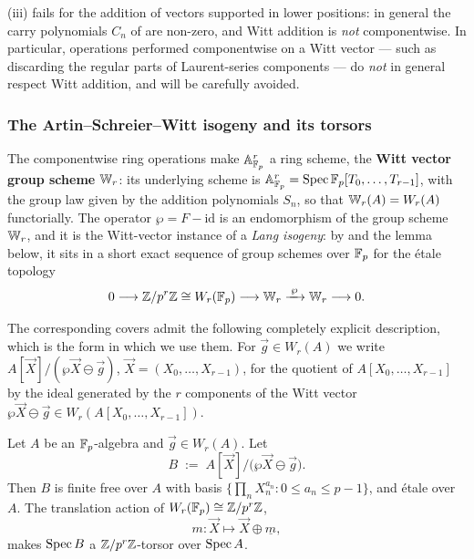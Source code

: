 \begin{rem*}
(iii) fails for the addition of vectors supported in
lower positions: in general the carry polynomials $C_n$ of
 are non-zero, and Witt addition is \emph{not}
componentwise. In particular, operations performed componentwise on a Witt vector ---
such as discarding the regular parts of Laurent-series components --- do \emph{not}
in general respect Witt addition, and will be carefully avoided.
\end{rem*}

\subsubsection*{The Artin--Schreier--Witt isogeny and its torsors}

The componentwise ring operations make $\mathbb{A}^r_{\mathbb{F}_p}$ a ring scheme, the
\textbf{Witt vector group scheme} $\mathbb{W}_r$: its underlying scheme is
$\mathbb{A}^r_{\mathbb{F}_p} = \operatorname{Spec} \mathbb{F}_p[T_0, \dots, T_{r-1}]$, with the group law given by the
addition polynomials $S_n$, so that $\mathbb{W}_r(A) = W_r(A)$ functorially. The operator
$\wp = F - \mathrm{id}$ is an endomorphism of the group scheme $\mathbb{W}_r$, and it is the
Witt-vector instance of a \emph{Lang isogeny}: by  and the
lemma below, it sits in a short exact sequence of group schemes over $\mathbb{F}_p$ for the
\'etale topology
\begin{equation}\label{eq:asw_lang_sequence:reorg}
0 \longrightarrow \mathbb{Z}/p^r\mathbb{Z} \cong W_r(\mathbb{F}_p)
\longrightarrow \mathbb{W}_r \xrightarrow{\;\wp\;} \mathbb{W}_r \longrightarrow 0 .
\end{equation}

The corresponding covers admit the following completely explicit description, which
is the form in which we use them. For $\vec g \in W_r(A)$ we write
$A[\vec X]/(\wp \vec X \ominus \vec g)$, $\vec X = (X_0, \dots, X_{r-1})$, for the
quotient of $A[X_0, \dots, X_{r-1}]$ by the ideal generated by the $r$ components of
the Witt vector $\wp \vec X \ominus \vec g \in W_r(A[X_0, \dots, X_{r-1}])$.

\begin{lemma}\label{lemma:asw_etale_torsor:reorg}
Let $A$ be an $\mathbb{F}_p$-algebra and $\vec g \in W_r(A)$. Let
\[
B \;:=\; A[\vec X]\big/\bigl(\wp \vec X \ominus \vec g\bigr).
\]
Then $B$ is finite free over $A$ with basis
$\bigl\{\prod_{n} X_n^{a_n} : 0 \le a_n \le p-1\bigr\}$, and \'etale over $A$. The
translation action of $W_r(\mathbb{F}_p) \cong \mathbb{Z}/p^r\mathbb{Z}$,
\[
m \colon \vec X \longmapsto \vec X \oplus \underline m ,
\]
makes $\operatorname{Spec} B$ a $\mathbb{Z}/p^r\mathbb{Z}$-torsor over $\operatorname{Spec} A$.
\end{lemma}

